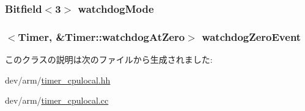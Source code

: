 \label{classCpuLocalTimer_1_1Timer_a1bc95b558c126e9393d024f8f7631549}
\hypertarget{classCpuLocalTimer_1_1Timer_abe0a1c55d5d90dbe169c060ef1cfb9a1}{
\subsubsection[{watchdogMode}]{\setlength{\rightskip}{0pt plus 5cm}Bitfield$<$3$>$ {\bf watchdogMode}}}
\label{classCpuLocalTimer_1_1Timer_abe0a1c55d5d90dbe169c060ef1cfb9a1}
\hypertarget{classCpuLocalTimer_1_1Timer_a6129a6827c6187d04c345125489dda09}{
\subsubsection[{watchdogZeroEvent}]{$<${\bf Timer}, \&Timer::watchdogAtZero$>$ {\bf watchdogZeroEvent}}}
\label{classCpuLocalTimer_1_1Timer_a6129a6827c6187d04c345125489dda09}


このクラスの説明は次のファイルから生成されました:\begin{DoxyCompactItemize}
\item 
dev/arm/\hyperlink{timer__cpulocal_8hh}{timer\_\-cpulocal.hh}\item 
dev/arm/\hyperlink{timer__cpulocal_8cc}{timer\_\-cpulocal.cc}\end{DoxyCompactItemize}
